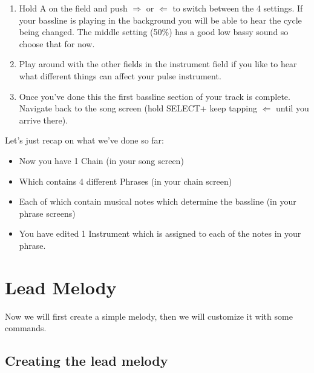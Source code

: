 \documentclass[]{article}
\newcommand{\buttonStyle}[1]{\textsf{#1}\xspace}
\newcommand{\buttonSymbolStyle}[1]{$\bm{#1}$\xspace}
\newcommand{\bA}{\buttonStyle{A}}
\newcommand{\bSelect}{\buttonStyle{{SELECT}}}
\newcommand{\bRight}{\buttonSymbolStyle{\Rightarrow}}
\newcommand{\bLeft}{\buttonSymbolStyle{\Leftarrow}}
\begin{document}
\begin{enumerate}[resume]

\item  Hold \bA on the field and push \bRight or \bLeft to switch between the 4 settings. If your bassline is playing in the background you will be able to hear the cycle being changed. The middle setting (50\%) has a good low bassy sound so choose that for now.

\item Play around with the other fields in the instrument field if you like to hear what different things can affect your pulse instrument.

\item Once you've done this the first bassline section of your track is complete. Navigate back to the song screen (hold \bSelect + keep tapping \bLeft until you arrive there).


\end{enumerate}

Let's just recap on what we've done so far: 
\begin{itemize}
	\item Now you have 1 Chain (in your song screen)
	\item  Which contains 4 different Phrases (in your chain screen) 
	\item Each of which contain musical notes which determine the bassline (in your phrase screens)
	\item  You have edited 1 Instrument which is assigned to each of the notes in your phrase.
	
\end{itemize}



\section{Lead Melody}

Now we will first create a simple melody, then we will customize it with some commands.

\subsection{Creating the lead melody}
\end{document}
